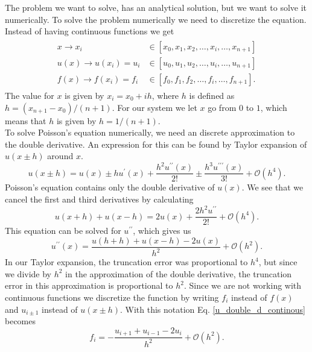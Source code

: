\documentclass[%
 reprint,
nofootinbib,
 amsmath,amssymb,
 aps,
]{revtex4-1}
\begin{document}
The problem we want to solve, has an analytical solution, but we want to solve it numerically.
To solve the problem numerically we need to discretize the equation. Instead of having continuous functions we get
\begin{align}
  \begin{split}
  x    \rightarrow x_i &\in [x_0, x_1, x_2, \hdots, x_i, \hdots, x_{n+1}]  \\
  u(x) \rightarrow u(x_i) = u_i &\in [u_0, u_1, u_2, \hdots, u_i, \hdots, u_{n+1}]\\
  f(x) \rightarrow f(x_i) = f_i &\in [f_0, f_1, f_2, \hdots, f_i, \hdots, f_{n+1}].
  \end{split}
\end{align}
The value for $x$ is given by $x_i = x_0 + ih$, where $h$ is defined as $h=(x_{n+1}-x_0)/(n+1)$. For our system we let $x$ go from $0$ to $1$, which means that $h$ is given by $h=1/(n+1)$.\\
To solve Poisson's equation numerically, we need an discrete approximation to the double derivative. An expression for this can be found by Taylor expansion of $u(x \pm h)$ around $x$.
\begin{equation}
  u(x\pm h) = u(x) \pm h u^{\prime}(x) + \frac{h^2 u^{\prime\prime}(x)}{2!} \pm  \frac{h^3 u^{\prime\prime\prime}(x)}{3!} + \mathcal{O}(h^4).
\end{equation}
Poisson's equation contains only the double derivative of $u(x)$. We see that we cancel the first and third derivatives by calculating
\begin{equation}
 u(x+h)+u(x-h) = 2u(x) + \frac{2h^2u^{\prime\prime}}{2!} + \mathcal{O}(h^4).
\end{equation}
This equation can be solved for $u^{\prime\prime}$, which gives us
\begin{equation}
  u^{\prime\prime}(x) = \frac{u(h+h)+u(x-h)-2u(x)}{h^2} + \mathcal{O}(h^2) \label{u_double_d_continous}.
\end{equation}
In our Taylor expansion, the truncation error was proportional to $h^4$, but since we divide by $h^2$ in the approximation of the double derivative, the truncation error in this approximation is proportional to $h^2$.
Since we are not working with continuous functions we discretize the function by writing  $f_{i}$ instead of $f(x)$ and $u_{i\pm 1}$ instead of $u(x\pm h)$. With this notation Eq. \eqref{u_double_d_continous} becomes
\begin{equation}
  f_i = -\frac{u_{i+1} + u_{i-1} - 2{u_i}}{h^2} + \mathcal{O}(h^2). \label{all_gore}
\end{equation}
\end{document}
